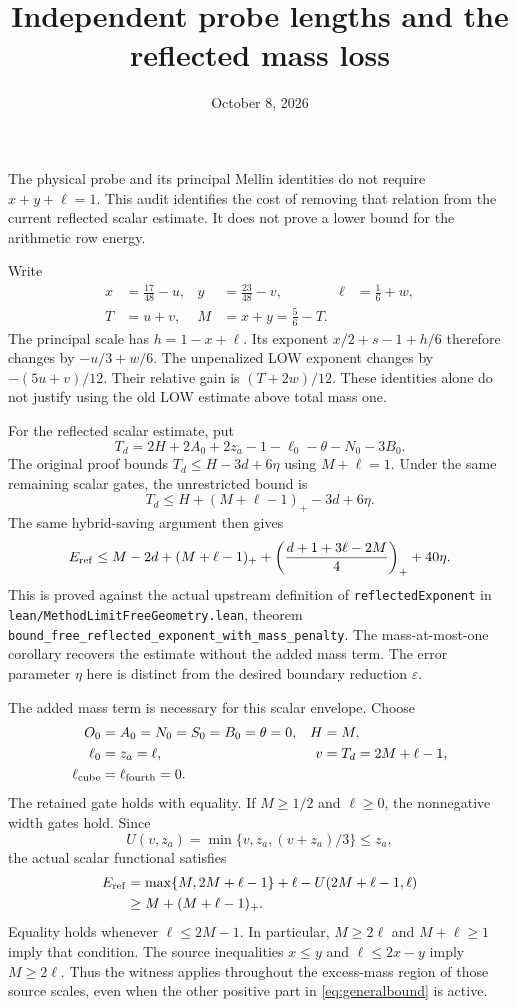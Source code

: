\documentclass[11pt]{article}
\begin{document}
\title{Independent probe lengths and the reflected mass loss}
\author{}
\date{October 8, 2026}
\maketitle

The physical probe and its principal Mellin identities do not require
$x+y+\ell=1$.  This audit identifies the cost of removing that relation
from the current reflected scalar estimate.  It does not prove a lower
bound for the arithmetic row energy.

Write
\[
 \begin{aligned}
 x&=\frac{17}{48}-u,& y&=\frac{23}{48}-v,& \ell&=\frac16+w,\\
 T&=u+v,& M&=x+y=\frac56-T.
 \end{aligned}
\]
The principal scale has $h=1-x+\ell$.  Its exponent
$x/2+s-1+h/6$ therefore changes by $-u/3+w/6$.
The unpenalized LOW exponent changes by $-(5u+v)/12$.
Their relative gain is $(T+2w)/12$.
These identities alone do not justify using the old LOW estimate above
total mass one.

For the reflected scalar estimate, put
\[
 T_d=2H+2A_0+2z_a-1-\ell_0-\theta-N_0-3B_0.
\]
The original proof bounds $T_d\le H-3d+6\eta$ using $M+\ell=1$.
Under the same remaining scalar gates, the unrestricted bound is
\[
 T_d\le H+(M+\ell-1)_+-3d+6\eta.
\]
The same hybrid-saving argument then gives
\begin{equation}\label{eq:generalbound}
 E_{\rm ref}\le M-2d+(M+\ell-1)_+
   +\left(\frac{d+1+3\ell-2M}{4}\right)_++40\eta.
\end{equation}
This is proved against the actual upstream definition of
\texttt{reflectedExponent} in
\nolinkurl{lean/MethodLimitFreeGeometry.lean}, theorem
\nolinkurl{bound_free_reflected_exponent_with_mass_penalty}.
The mass-at-most-one corollary recovers the estimate without the added
mass term.  The error parameter $\eta$ here is distinct from the desired
boundary reduction $\varepsilon$.

The added mass term is necessary for this scalar envelope.  Choose
\[
 \begin{aligned}
 O_0&=A_0=N_0=S_0=B_0=\theta=0,& H&=M,\\
 \ell_0&=z_a=\ell,& v&=T_d=2M+\ell-1,\\
 \ell_{\rm cube}&=\ell_{\rm fourth}=0.
 \end{aligned}
\]
The retained gate holds with equality.  If $M\ge1/2$ and $\ell\ge0$,
the nonnegative width gates hold.  Since
\[
 U(v,z_a)=\min\{v,z_a,(v+z_a)/3\}\le z_a,
\]
the actual scalar functional satisfies
\[
 \begin{aligned}
 E_{\rm ref}&=\max\{M,2M+\ell-1\}+\ell-U(2M+\ell-1,\ell)\\
 &\ge M+(M+\ell-1)_+.
 \end{aligned}
\]
Equality holds whenever $\ell\le2M-1$.
In particular, $M\ge2\ell$ and $M+\ell\ge1$ imply that condition.
The source inequalities $x\le y$ and $\ell\le2x-y$ imply
$M\ge2\ell$.  Thus the witness applies throughout the excess-mass
region of those source scales, even when the other positive part in
\eqref{eq:generalbound} is active.
\end{document}
